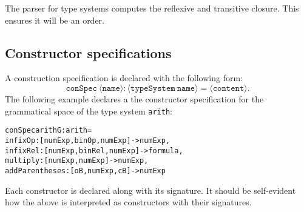 \documentclass[a4paper]{article}
\theoremstyle{definition}
\begin{document}
	The parser for type systems computes the reflexive and transitive closure. This ensures it will be an order.

	\subsection{Constructor specifications}
	A construction specification is declared with the following form: $$\mathtt{conSpec\ \langle name\rangle : \langle typeSystem\ name\rangle = \langle content\rangle}.$$ The following example declares a the constructor specification for the grammatical space of the type system \texttt{arith}:
\begin{alltt}
conSpec arithG:arith =
    infixOp : [numExp,binOp,numExp] -> numExp,
    infixRel : [numExp,binRel,numExp] -> formula,
    multiply : [numExp,numExp] -> numExp,
    addParentheses : [oB,numExp,cB] -> numExp
\end{alltt}
	Each constructor is declared along with its signature. It should be self-evident how the above is interpreted as constructors with their signatures.
\end{document}

